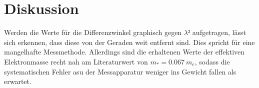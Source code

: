 \section{Diskussion}
\label{sec:Diskussion}
Werden die Werte für die Differenzwinkel graphisch gegen $\lambda²$ aufgetragen, lässt sich erkennen, dass diese von der Geraden weit entfernt sind. Dies spricht für eine mangelhafte Messmethode. Allerdings sind die erhaltenen Werte der effektiven Elektronmasse recht nah am Literaturwert von $m_* = \SI{0.067}{m_e}$, sodass die systematischen Fehler asu der Messapparatur weniger ins Gewicht fallen als erwartet.
